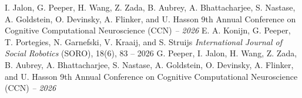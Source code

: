 \documentclass[10pt,a4paper]{article}
\newcommand{\cvbullet}{\fontsize{6}{6}\selectfont$\bullet$}
\newenvironment{publist}{%
  \begin{itemize}[label={\color{accent}\cvbullet}, leftmargin=9.6pt, labelsep=4pt,
                  topsep=4pt, partopsep=0pt, parsep=0pt, itemsep=4pt]}
  {\end{itemize}}
\newcommand{\au}[1]{{#1}}
\begin{document}
\begin{publist}
    {\au{I. Jalon}, \au{G. Peeper}, \au{H. Wang}, \au{Z. Zada}, \au{B. Aubrey}, \au{A.
      Bhattacharjee}, \au{S. Nastase}, \au{A. Goldstein}, \au{O. Devinsky}, \au{A. Flinker},
      and \au{U. Hasson}}
    {9th Annual Conference on Cognitive Computational Neuroscience (CCN) \textit{-- 2026}}
    {\au{E. A. Konijn}, \au{G. Peeper}, \au{T. Portegies}, \au{N. Garnefski}, \au{V.
      Kraaij}, and \au{S. Struijs}}
    {\textit{International Journal of Social Robotics} (SORO), 18(6), 83 -- 2026}
    {\au{G. Peeper}, \au{I. Jalon}, \au{H. Wang}, \au{Z. Zada}, \au{B. Aubrey}, \au{A.
      Bhattacharjee}, \au{S. Nastase}, \au{A. Goldstein}, \au{O. Devinsky}, \au{A. Flinker},
      and \au{U. Hasson}}
    {9th Annual Conference on Cognitive Computational Neuroscience (CCN) \textit{-- 2026}}
\end{publist}
\end{document}
